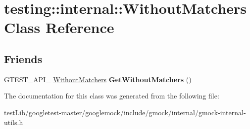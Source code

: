 \hypertarget{classtesting_1_1internal_1_1WithoutMatchers}{}\section{testing\+:\+:internal\+:\+:Without\+Matchers Class Reference}
\label{classtesting_1_1internal_1_1WithoutMatchers}
\subsection*{Friends}
\begin{DoxyCompactItemize}
\item 
\mbox{\label{classtesting_1_1internal_1_1WithoutMatchers_aec6c0de08b3c9096e2365c023664a848}} 
G\+T\+E\+S\+T\+\_\+\+A\+P\+I\+\_\+ \hyperlink{classtesting_1_1internal_1_1WithoutMatchers}{Without\+Matchers} {\bfseries Get\+Without\+Matchers} ()
\end{DoxyCompactItemize}


The documentation for this class was generated from the following file\+:\begin{DoxyCompactItemize}
\item 
test\+Lib/googletest-\/master/googlemock/include/gmock/internal/gmock-\/internal-\/utils.\+h\end{DoxyCompactItemize}
